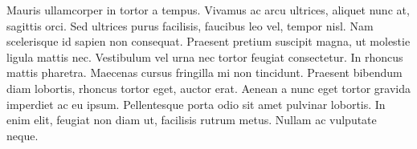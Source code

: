 \documentclass[conference]{./sty/IEEEtran}
\begin{document}
Mauris ullamcorper in tortor a tempus. Vivamus ac arcu ultrices, aliquet nunc
at, sagittis orci. Sed ultrices purus facilisis, faucibus leo vel, tempor nisl.
Nam scelerisque id sapien non consequat. Praesent pretium suscipit magna, ut
molestie ligula mattis nec. Vestibulum vel urna nec tortor feugiat consectetur.
In rhoncus mattis pharetra. Maecenas cursus fringilla mi non tincidunt.
Praesent bibendum diam lobortis, rhoncus tortor eget, auctor erat. Aenean a
nunc eget tortor gravida imperdiet ac eu ipsum. Pellentesque porta odio sit
amet pulvinar lobortis. In enim elit, feugiat non diam ut, facilisis rutrum
metus. Nullam ac vulputate neque.



% 
% 
\end{document}
